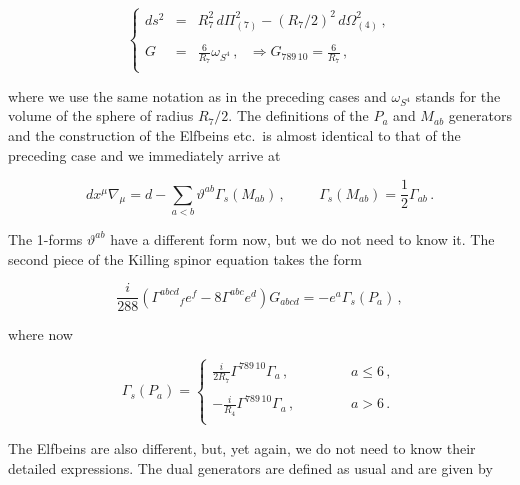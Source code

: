 \documentclass[12pt,a4paper]{article}
\begin{document}
\begin{equation}
\label{eq:ads7xs4}
\left\{
  \begin{array}{rcl}
ds^{2} & = & R_{7}^{2}\,  d\Pi_{(7)}^{2} 
-(R_{7}/2)^{2}\, d\Omega_{(4)}^{2}\, , \\
& & \\
G & = & \frac{6}{R_{7}}\omega_{S^{4}}\, ,
\,\,\,\,
\Rightarrow 
G_{789\, 10}=\frac{6}{R_{7}}\, ,\\
  \end{array}
\right.
\end{equation}

\noindent 
where we use the same notation as in the preceding cases and
$\omega_{S^{4}}$ stands for the volume of the sphere of radius
$R_{7}/2$. The definitions of the $P_{a}$ and $M_{ab}$ generators and
the construction of the Elfbeins etc.~is almost identical to that of
the preceding case and we immediately arrive at

\begin{equation}
dx^{\mu}\nabla_{\mu} = d - \sum_{a<b}\vartheta^{ab}\Gamma_{s}(M_{ab})\, ,  
\hspace{1cm}
\Gamma_{s}(M_{ab}) ={\textstyle\frac{1}{2}}\Gamma_{ab}\, .
\end{equation}

The 1-forms $\vartheta^{ab}$ have a different form now, but we do not
need to know it.  The second piece of the Killing spinor equation
takes the form

\begin{equation}
{\textstyle\frac{i}{288}}\left(\Gamma^{abcd}{}_{f} e^{f}
-8\Gamma^{abc}e^{d} \right)G_{abcd}=
-e^{a}\Gamma_{s}(P_{a})\, ,
\end{equation}

\noindent 
where now 

\begin{equation}
\Gamma_{s}(P_{a}) =
\left\{
  \begin{array}{ccc}
\frac{i}{2R_{7}}\Gamma^{789\, 10}\Gamma_{a}\, ,& \hspace{1cm} & a\leq 6\, ,\\
& & \\
-\frac{i}{R_{4}}\Gamma^{789\, 10}\Gamma_{a}\, ,& \hspace{1cm} & a> 6\, .\\
  \end{array}
\right.  
\end{equation}

The Elfbeins are also different, but, yet again, we do not need to
know their detailed expressions. The dual generators are defined as usual
and are given by
\end{document}
